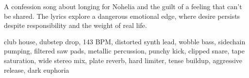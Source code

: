 

\begin{notes}
A confession song about longing for Nohelia and the guilt of a feeling that can’t be shared. %
The lyrics explore a dangerous emotional edge, where desire persists despite responsibility and the weight of real life.
\end{notes}

\begin{style}
club house, dubstep drop, 143 BPM, distorted synth lead, wobble bass, sidechain pumping, filtered saw pads, metallic percussion, punchy kick, clipped snare, tape saturation, wide stereo mix, plate reverb, hard limiter, tense buildup, aggressive release, dark euphoria
\end{style}

